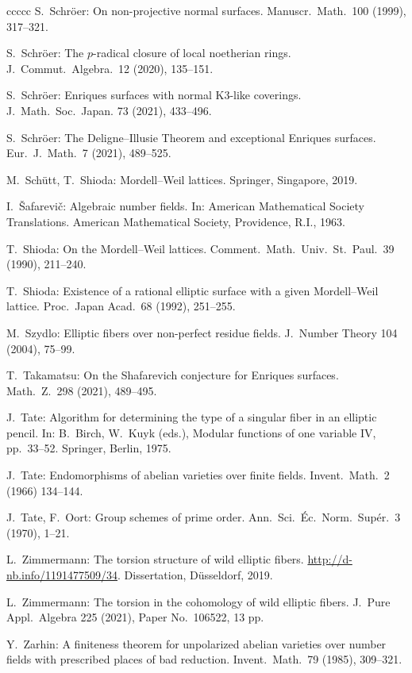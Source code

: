 \documentclass[oneside, 12pt]{amsart}
\theoremstyle{definition}
\theoremstyle{remark}
\begin{document}
\begin{thebibliography}{ccccc}
S.\ Schr\"oer:
On non-projective normal surfaces.
Manuscr.\ Math.\ 100 (1999), 317--321.

S.\ Schr\"oer:
The $p$-radical closure of local noetherian rings.
J.\ Commut.\ Algebra.\ 12 (2020), 135--151.

S.\ Schr\"oer:
Enriques surfaces with normal K3-like coverings.
J.\ Math.\ Soc.\ Japan. 73 (2021), 433--496.
 
S.\ Schr\"oer:
The Deligne--Illusie Theorem and exceptional Enriques surfaces.
Eur.\ J.\ Math.\ 7 (2021), 489--525.

M.\ Sch\"utt, T.\ Shioda:
Mordell--Weil lattices.
Springer, Singapore, 2019. 

I.\ \v{S}afarevi\v{c}:
Algebraic number fields. 
In: American Mathematical Society Translations.
American Mathematical Society, Providence, R.I., 1963.

T.\ Shioda:
On the Mordell--Weil lattices.
Comment.\ Math.\ Univ.\ St.\ Paul.\ 39 (1990), 211--240. 

T.\ Shioda:
Existence of a rational elliptic surface with a given Mordell--Weil lattice. 
Proc.\ Japan Acad.\ 68 (1992),  251--255.

M.\ Szydlo:
Elliptic fibers over non-perfect residue fields. 
J.\ Number Theory 104 (2004),   75--99.
 
T.\ Takamatsu: 
On the Shafarevich conjecture for Enriques surfaces.
Math.\ Z.\ 298 (2021),  489--495. 

J.\ Tate:
Algorithm for determining the type of a singular fiber in an elliptic pencil.  
In: 
B.\ Birch, W.\ Kuyk (eds.),
Modular functions of one variable IV,  pp.\ 33--52. 
Springer, Berlin, 1975.

J.\ Tate:
Endomorphisms of abelian varieties over finite fields.
Invent.\ Math.\ 2 (1966) 134--144.

J.\ Tate,  F.\ Oort:
Group schemes of prime order.  
Ann.\ Sci.\ \'Ec.\ Norm.\ Sup\'er.\   3  (1970), 1--21.

L.\ Zimmermann:
The torsion structure of wild elliptic fibers.
 \url{http://d-nb.info/1191477509/34}. Dissertation,  D\"usseldorf, 2019.

L.\ Zimmermann:
The torsion in the cohomology of wild elliptic fibers.
J.\ Pure Appl.\ Algebra 225 (2021),  Paper No.\ 106522, 13 pp. 

Y.\ Zarhin:
A finiteness theorem for unpolarized abelian varieties over number fields with prescribed places of bad reduction. 
Invent.\ Math.\ 79 (1985),  309--321.

\end{thebibliography}
\end{document}
